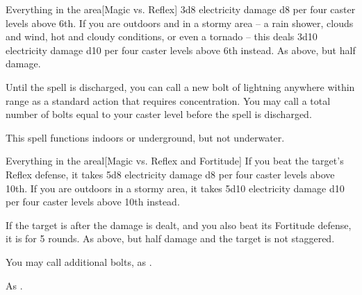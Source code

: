 \begin{spellheader}
\end{spellheader}
\begin{spelleffects}
    \begin{spelltargets}{Everything in the area}[Magic vs. Reflex]
        \spellsuccess 3d8 electricity damage \add d8 per four caster levels above 6th. If you are outdoors and in a stormy area -- a rain shower, clouds and wind, hot and cloudy conditions, or even a tornado -- this deals 3d10 electricity damage \add d10 per four caster levels above 6th instead.
        \spellfailure As above, but half damage.
    \end{spelltargets}
    \spelleffect Until the spell is discharged, you can call a new bolt of lightning anywhere within range as a standard action that requires concentration. You may call a total number of bolts equal to your caster level before the spell is discharged.
\end{spelleffects}
\begin{spellfooter}
    \spellnotes This spell functions indoors or underground, but not underwater. \destructivespellnotes
\end{spellfooter}

\begin{spellheader}
\end{spellheader}
\begin{spelleffects}
    \begin{spelltargets}{Everything in the area}l[Magic vs. Reflex and Fortitude]
        \spellsuccess If you beat the target's Reflex defense, it takes 5d8 electricity damage \add d8 per four caster levels above 10th. If you are outdoors in a stormy area, it takes 5d10 electricity damage \add d10 per four caster levels above 10th instead.

        If the target is \bloodied after the damage is dealt, and you also beat its Fortitude defense, it is \staggered for 5 rounds.
        \spellfailure As above, but half damage and the target is not staggered.
    \end{spelltargets}
    \spelleffect You may call additional bolts, as .
\end{spelleffects}
\begin{spellfooter}
    \spellnotes As .
\end{spellfooter}

